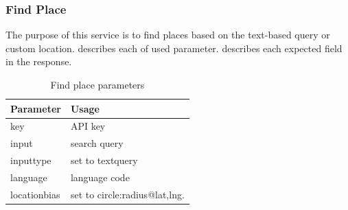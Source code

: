 \subsubsection{Find Place}
The purpose of this service is to find places based on the text-based query or custom location.   describes each of used parameter. describes each expected field in the response. 

\begin{table}[htbp]
\centering
\begin{tabularx}{\textwidth}{|l|X|}
\hline
\textbf{Parameter} & \textbf{Usage}                                                    \\ \hline
key                & API key                                                           \\ \hline
input              & search query                                                      \\ \hline
inputtype          & set to textquery                                                  \\ \hline
language           & language code                    \\ \hline
locationbias       & set to circle:radius@lat,lng.                                     \\ \hline
\end{tabularx}
\caption{Find place parameters}
\label{table:gapi-find-place-params}
\end{table}
